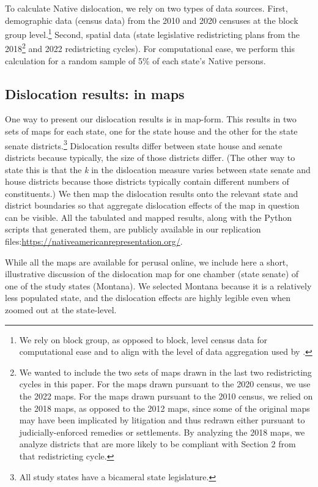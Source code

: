 \documentclass[12pt]{article}
\begin{document}
To calculate Native dislocation, we rely on two types of data sources.  First, demographic data (census data) from the 2010 and 2020 censuses at the block group level.\footnote{We rely on block group, as opposed to block, level census data for computational ease and to align with the level of data aggregation used by \cite{deford2022partisan}.} Second, spatial data (state legislative redistricting plans from the 2018\footnote{We wanted to include the two sets of maps drawn in the last two redistricting cycles in this paper.  For the maps drawn pursuant to the 2020 census, we use the 2022 maps.  For the maps drawn pursuant to the 2010 census, we relied on the 2018 maps, as opposed to the 2012 maps, since some of the original maps may have been implicated by litigation and thus redrawn either pursuant to judicially-enforced remedies or settlements. By analyzing the 2018 maps, we analyze districts that are more likely to be compliant with Section 2 from that redistricting cycle.} and 2022 redistricting cycles).  For computational ease, we perform this calculation for a random sample of 5\% of each state's Native persons.

\subsection{Dislocation results: in maps}

One way to present our dislocation results is in map-form.  This results in two sets of maps for each state, one for the state house and the other for the state senate districts.\footnote{All study states have a bicameral state legislature.} Dislocation results differ between state house and senate districts because typically, the size of those districts differ.  (The other way to state this is that the \textit{k} in the dislocation measure varies between state senate and house districts because those districts typically contain different numbers of constituents.)  We then map the dislocation results onto the relevant state and district boundaries so that aggregate dislocation effects of the map in question can be visible. All the tabulated and mapped results, along with the Python scripts that generated them, are publicly available in our replication files:\url{https://nativeamericanrepresentation.org/}.

While all the maps are available for perusal online, we include here a short, illustrative discussion of the dislocation map for one chamber (state senate) of one of the study states (Montana).  We selected Montana because it is a relatively less populated state, and the dislocation effects are highly legible even when zoomed out at the state-level.
\end{document}

